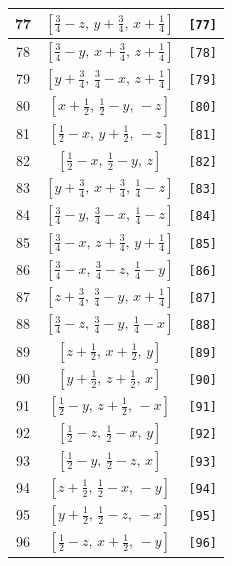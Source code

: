 \documentclass[fleqn,8pt]{jsarticle}
\begin{document}
\begin{longtable}{ccc}
77 & $\left[ \frac{3}{4} - z,\, y + \frac{3}{4},\, x + \frac{1}{4} \right]$ & {\tt [77]} \\ \hline
78 & $\left[ \frac{3}{4} - y,\, x + \frac{3}{4},\, z + \frac{1}{4} \right]$ & {\tt [78]} \\ \hline
79 & $\left[ y + \frac{3}{4},\, \frac{3}{4} - x,\, z + \frac{1}{4} \right]$ & {\tt [79]} \\ \hline
80 & $\left[ x + \frac{1}{2},\, \frac{1}{2} - y,\, - z \right]$ & {\tt [80]} \\ \hline
81 & $\left[ \frac{1}{2} - x,\, y + \frac{1}{2},\, - z \right]$ & {\tt [81]} \\ \hline
82 & $\left[ \frac{1}{2} - x,\, \frac{1}{2} - y,\, z \right]$ & {\tt [82]} \\ \hline
83 & $\left[ y + \frac{3}{4},\, x + \frac{3}{4},\, \frac{1}{4} - z \right]$ & {\tt [83]} \\ \hline
84 & $\left[ \frac{3}{4} - y,\, \frac{3}{4} - x,\, \frac{1}{4} - z \right]$ & {\tt [84]} \\ \hline
85 & $\left[ \frac{3}{4} - x,\, z + \frac{3}{4},\, y + \frac{1}{4} \right]$ & {\tt [85]} \\ \hline
86 & $\left[ \frac{3}{4} - x,\, \frac{3}{4} - z,\, \frac{1}{4} - y \right]$ & {\tt [86]} \\ \hline
87 & $\left[ z + \frac{3}{4},\, \frac{3}{4} - y,\, x + \frac{1}{4} \right]$ & {\tt [87]} \\ \hline
88 & $\left[ \frac{3}{4} - z,\, \frac{3}{4} - y,\, \frac{1}{4} - x \right]$ & {\tt [88]} \\ \hline
89 & $\left[ z + \frac{1}{2},\, x + \frac{1}{2},\, y \right]$ & {\tt [89]} \\ \hline
90 & $\left[ y + \frac{1}{2},\, z + \frac{1}{2},\, x \right]$ & {\tt [90]} \\ \hline
91 & $\left[ \frac{1}{2} - y,\, z + \frac{1}{2},\, - x \right]$ & {\tt [91]} \\ \hline
92 & $\left[ \frac{1}{2} - z,\, \frac{1}{2} - x,\, y \right]$ & {\tt [92]} \\ \hline
93 & $\left[ \frac{1}{2} - y,\, \frac{1}{2} - z,\, x \right]$ & {\tt [93]} \\ \hline
94 & $\left[ z + \frac{1}{2},\, \frac{1}{2} - x,\, - y \right]$ & {\tt [94]} \\ \hline
95 & $\left[ y + \frac{1}{2},\, \frac{1}{2} - z,\, - x \right]$ & {\tt [95]} \\ \hline
96 & $\left[ \frac{1}{2} - z,\, x + \frac{1}{2},\, - y \right]$ & {\tt [96]} \\
\end{longtable}
\end{document}
